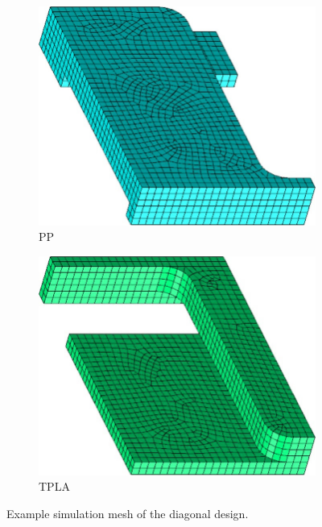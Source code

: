 \begin{figure}
	\centering
	\begin{subfigure}[B]{.45\columnwidth}
		\centering
		\includegraphics[width=\columnwidth]{sources/simulation/mesh-pp.jpg}
		\caption{PP}
	\end{subfigure}
	\begin{subfigure}[B]{.45\columnwidth}
		\centering
		\includegraphics[width=\columnwidth]{sources/simulation/mesh-pla.jpg}
		\caption{TPLA}
	\end{subfigure}
	\caption{Example simulation mesh of the diagonal design.}
	\label{fig:sim_diagonal_model}
\end{figure}



